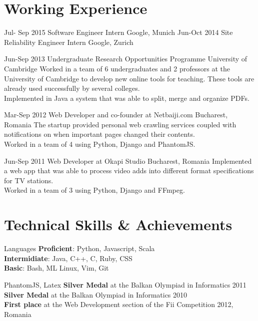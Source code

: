 \documentclass[]{friggeri-cv}
\begin{document}
\section{Working Experience}
\begin{entrylist}
  \entry
  {Jul- Sep 2015}
  {}
  {Software Engineer Intern}
  {Google, Munich}
  {}
  \entry
  {Jun-Oct 2014}
  {}
  {Site Reliability Engineer Intern}
  {Google, Zurich}
  {}
  
  \entry
  {Jun-Sep 2013} 
  {}
  {Undergraduate Research Opportunities Programme}
  {University of Cambridge}
  {
    Worked in a team of 6 undergraduates and 2 professors at the University of Cambridge to develop new online tools
    for teaching.
    These tools are already used successfully by several colleges.\\

    Implemented in Java a system that was able to split, merge and organize PDFs.
  }

  \entry
  {Mar-Sep 2012}
  {}
  {Web Developer and co-founder at Netbaiji.com}
  {Bucharest, Romania}
  {
    The startup provided personal web crawling services coupled with notifications on when important pages changed
    their contents. \\  

    Worked in a team of 4 using Python, Django and PhantomJS.
  }

  \entry
  {Jun-Sep 2011}
  {}
  {Web Developer at Okapi Studio}
  {Bucharest, Romania}
  {
    Implemented a web app that was able to process video adds into different format specifications for TV stations. \\

    Worked in a team of 3 using Python, Django and FFmpeg.
  }

\end{entrylist}

\section{Technical Skills \& Achievements}
\begin{entrylist}
  \simpleentry
  {Languages}
  {
    \textbf{Proficient}:  Python, Javascript, Scala \\
    \textbf{Intermidiate}:  Java, C++, C, Ruby, CSS \\
    \textbf{Basic}:  Bash, ML
  }
   {
    Linux, Vim, Git
  }

   {
    PhantomJS, Latex
  }
   {
    \textbf{Silver Medal} at the Balkan Olympiad in Informatics 2011 \\
    \textbf{Silver Medal} at the Balkan Olympiad in Informatics 2010 \\
    \textbf{First place} at the Web Development section of the Fii Competition 2012, Romania
  }
\end{entrylist}
\end{document}

